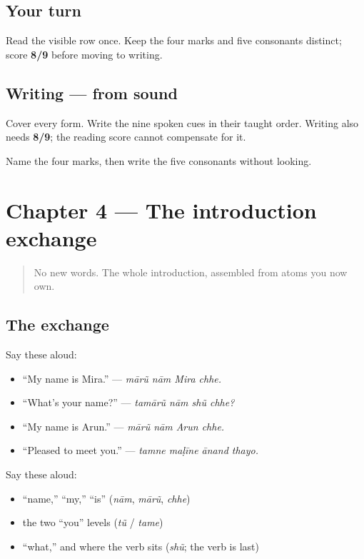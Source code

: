 \subsection*{Your turn}
Read the visible row once. Keep the four marks and five consonants distinct; score \textbf{8/9} before moving to writing.

\subsection*{Writing — from sound}
Cover every form. Write the nine spoken cues in their taught order. Writing also needs \textbf{8/9}; the reading score cannot compensate for it.

\begin{tcolorbox}[breakable,colback=teal!4,colframe=teal!35!black,title={Before you move on}]
Name the four marks, then write the five consonants without looking.
\end{tcolorbox}
\section[Practice]{Chapter 4 — The introduction exchange}

\label{lesson:GU-C02-practice}



\begin{quote}
No new words. The whole introduction, assembled from atoms you now own.
\end{quote}

\subsection*{The exchange}
Say these aloud:

\begin{itemize}
\raggedright
  \item \textquotedblleft{}My name is Mira.\textquotedblright{} — \emph{mārũ nām Mira chhe.}
  \item \textquotedblleft{}What's your name?\textquotedblright{} — \emph{tamārũ nām shũ chhe?}
  \item \textquotedblleft{}My name is Arun.\textquotedblright{} — \emph{mārũ nām Arun chhe.}
  \item \textquotedblleft{}Pleased to meet you.\textquotedblright{} — \emph{tamne maḷīne ānand thayo.}
\end{itemize}

\begin{cousinweb}
Say these aloud:

\begin{itemize}
\raggedright
  \item \textquotedblleft{}name,\textquotedblright{} \textquotedblleft{}my,\textquotedblright{} \textquotedblleft{}is\textquotedblright{} (\emph{nām}, \emph{mārũ}, \emph{chhe})
  \item the two \textquotedblleft{}you\textquotedblright{} levels (\emph{tũ} / \emph{tame})
  \item \textquotedblleft{}what,\textquotedblright{} and where the verb sits (\emph{shũ}; the verb is last)
\end{itemize}
\end{cousinweb}

